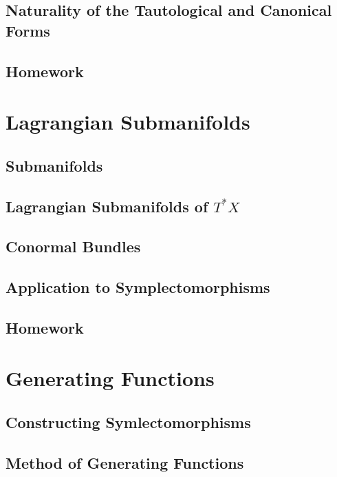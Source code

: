 \documentclass[4paper]{article}
\begin{document}
\subsection{Naturality of the Tautological and Canonical Forms}

\subsection{Homework} 

\section{Lagrangian Submanifolds}

\subsection{Submanifolds}

\subsection{Lagrangian Submanifolds of $ T^*X $}

\subsection{Conormal Bundles}

\subsection{Application to Symplectomorphisms}

\subsection{Homework}

\section{Generating Functions}

\subsection{Constructing Symlectomorphisms}

\subsection{Method of Generating Functions}
\end{document}
